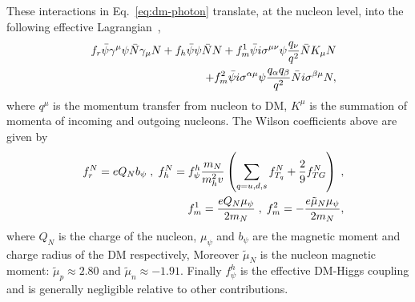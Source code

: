 \documentclass[aps,prd,letterpaper,showpacs,twocolumn,preprintnumbers,floatfix,superscriptaddress]{revtex4-1}
\newcommand{\red}[1]{{\textcolor{red}{#1}}}
\begin{document}

These interactions in Eq.~\ref{eq:dm-photon} translate, at the nucleon level, 
into the following effective Lagrangian~\cite{Chang:2014tea,Hamze:2014wca,Ibarra:2015fqa},
\begin{eqnarray}
&& f_r\bar \psi \gamma^\mu \psi \bar N \gamma_\mu N +f_h \bar \psi \psi \bar N N + f_m^1\bar \psi i\sigma^{\mu\nu} \psi { q_\nu \over q^2 } \bar N K_\mu N  \nonumber\\
&& +f_m^2 \bar \psi i\sigma^{\alpha\mu} \psi { q_\alpha q_\beta \over q^2 } \bar N i\sigma^{\beta \mu} N , 
  \label{effectnucl}
\end{eqnarray}
where $q^{\mu}$ is the momentum transfer from nucleon to DM, $K^{\mu}$ is the summation of momenta of 
incoming and outgoing nucleons. The Wilson coefficients above are given by 
\begin{eqnarray}
  &&  f_r^N = e Q_N b_\psi \; , \hspace{0.1cm} f_h^N = f_\psi^h {m_N \over m_h^2 v}\left( \sum_{q=u,d,s}  f_{T_q}^N + {2\over 9} f_{TG}^N\right)\; ,  \nonumber\\
  && f_m^1 = \frac{e Q_N \mu_\psi}{2m_N}\; ,  \hspace{0.1cm} f_m^2 = -\frac{e \tilde{\mu}_N \mu_\psi}{2m_N} ,\nonumber 
\end{eqnarray}
where $Q_N$ is the charge of the nucleon, $\mu_\psi$ and $b_\psi$ are the magnetic moment and charge radius of the DM 
respectively, Moreover $\tilde \mu_N $ is the nucleon magnetic moment: $\tilde{\mu}_p \approx 2.80$ and $\tilde{\mu}_n \approx -1.91$. 
Finally $f_{\psi}^h$ is the effective DM-Higgs coupling and is generally negligible relative to other 
contributions. 
\end{document}

